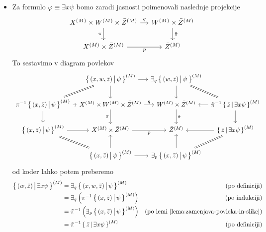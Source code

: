 \documentclass[../kategoricna_logika.tex]{subfiles}
\begin{document}
\begin{dokaz}
\begin{itemize}
    \item Za formulo $\varphi \equiv \exists x \psi$ bomo zaradi
      jasnosti poimenovali naslednje projekcije
      \begin{equation*}
        \begin{tikzcd}[column sep=small]
          \interp{X} \times \interp{W} \times \interp{\bar{Z}} \ar[d,
          "\pi"'] \ar[r, "q"] &
          \interp{W} \times \interp{\bar{Z}} \ar[d, "\tilde{\pi}"] \\
          \interp{X} \times \interp{\bar{Z}} \ar[r, "p"'] &
          \interp{\bar{Z}}
        \end{tikzcd}
      \end{equation*}
      To sestavimo v diagram povlekov {\scriptsize
        \begin{equation*}
          \begin{tikzcd}[column sep=tiny]
            & \setb{(x,w,\bar{z})}{\psi}^{(M)} \ar[dl, equal] \ar[d] \ar[r] & \exists_q \setb{(w,\bar{z})}{\psi}^{(M)} \ar[d] \ar[dr, equal] & \\
            \pi^{-1}\setb{(x,\bar{z})}{\psi}^{(M)} \ar[d] \ar[r] & X^{(M)} \times W^{(M)} \times \bar{Z}^{(M)} \ar[d, "\pi"'] \ar[r, "q"] & W^{(M)} \times \bar{Z}^{(M)} \ar[d, "\tilde{\pi}"] & \tilde{\pi}^{-1} \setb{\bar{z}}{\exists x \psi}^{(M)} \ar[l] \ar[d] \\
            \setb{(x,\bar{z})}{\psi}^{(M)} \ar[dr, equal] \ar[r] & X^{(M)} \times \bar{Z}^{(M)} \ar[r, "p"'] & \bar{Z}^{(M)}  & \setb{\bar{z}}{\exists x \psi}^{(M)} \ar[l] \ar[dl, equal] \\
            & \setb{(x,\bar{z})}{\psi}^{(M)} \ar[u] \ar[r] & \exists_p
            \setb{(x,\bar{z})}{\psi}^{(M)} \ar[u] &
          \end{tikzcd}
        \end{equation*}
      } od koder lahko potem preberemo
      \begin{align*}
        \left\lbrace\, (w, \bar{z}) \,\middle|\, \exists x \psi \,\right\rbrace^{(M)} &= \exists_q \left\lbrace\, (x,w,\bar{z}) \,\middle|\, \psi \,\right\rbrace^{(M)} &\text{(po definiciji)} \\
                                                  &= \exists_q \left( \pi^{-1} \left\lbrace\, (x, \bar{z}) \,\middle|\, \psi \,\right\rbrace^{(M)}\right) &\text{(po indukciji)} \\
                                                  &= \tilde{\pi}^{-1} \left( \exists_p \left\lbrace\, (x,\bar{z}) \,\middle|\, \psi \,\right\rbrace^{(M)} \right) &\text{(po lemi \ref{lema:zamenjava-povleka-in-slike})} \\
                                                  &= \tilde{\pi}^{-1} \left\lbrace\, \bar{z} \,\middle|\, \exists x \psi \,\right\rbrace^{(M)} &\text{(po definiciji)}
      \end{align*}
    \end{itemize}
  \end{dokaz}
\end{document}
